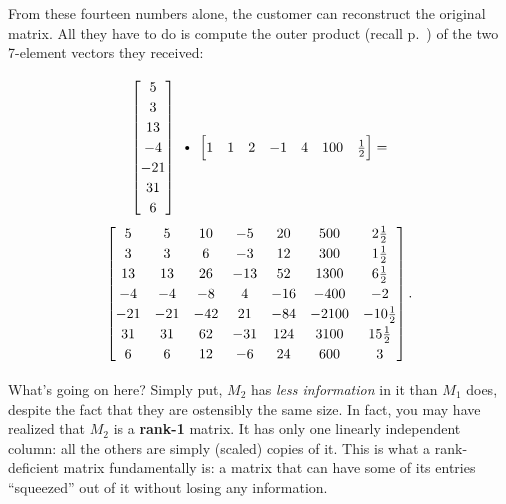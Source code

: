 \begin{alttitles}
\begin{compactenum}
\end{compactenum}


From these fourteen numbers alone, the customer can reconstruct the original
matrix. All they have to do is compute the outer product (recall
p.~\pageref{outerProduct}) of the two 7-element vectors they received:

\vspace{-.15in}
\begin{gather*}
\begin{bmatrix}
5 \\ 3 \\ 13 \\ -4 \\ -21 \\ 31 \\ 6 \\
\end{bmatrix} \ \textrm{\textbullet} \ 
\begin{bmatrix}
1 & 1 & 2 & -1 & 4 & 100 & \frac{1}{2} \\
\end{bmatrix} =\\
\begingroup
\renewcommand*{\arraystretch}{1.2}
\begin{bmatrix}
5 & 5 & 10 & -5 & 20 & 500 & 2\frac{1}{2} \\
3 & 3 & 6 & -3 & 12 & 300 & 1\frac{1}{2} \\
13 & 13 & 26 & -13 & 52 & 1300 & 6\frac{1}{2} \\
-4 & -4 & -8 & 4 & -16 & -400 & -2 \\
-21 & -21 & -42 & 21 & -84 & -2100 & -10\frac{1}{2} \\
31 & 31 & 62 & -31 & 124 & 3100 & 15\frac{1}{2} \\
6 & 6 & 12 & -6 & 24 & 600 & 3 \\
\end{bmatrix}.
\endgroup
\end{gather*}
\vspace{-.15in}

\medskip
\label{rank-deficient}

What's going on here? Simply put, $M_2$ has \textit{less information} in it
than $M_1$ does, despite the fact that they are ostensibly the same size. In
fact, you may have realized that $M_2$ is a \textbf{rank-1} matrix. It has only
one linearly independent column: all the others are simply (scaled) copies of
it. This is what a rank-deficient matrix fundamentally is: a matrix that can
have some of its entries ``squeezed'' out of it without losing any information.


\end{alttitles}
